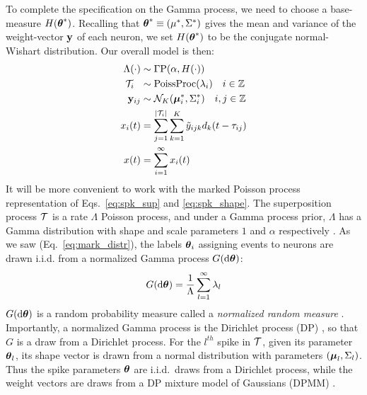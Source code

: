 To complete the specification on the Gamma process, we need to choose a base-measure $H(\boldsymbol{\theta}^*)$.
Recalling that $\boldsymbol{\theta}^* \equiv (\mu^*, \Sigma^*)$ gives the mean and variance of the weight-vector $\mathbf{y}$ of each neuron, we set $H(\boldsymbol{\theta}^*)$ 
to be the conjugate normal-Wishart distribution. Our overall model is then:
\begin{subequations}
\begin{align}
  \Lambda(\cdot) & \sim \Gamma \text{P}(\alpha, H(\cdot)) \\ %
  \mc{T}_i\ \  &\sim \text{PoissProc}(\lambda_i) \quad i \in \ZZ \\
  \by_{ij} & \sim \mc{N}_K(\mb{\mu}^*_i, \Sigma^*_i) \quad i,j \in \ZZ \\
  x_i(t) &= \sum_{j = 1}^{|\mc{T}_i|}  \sum_{k = 1}^{K} \tilde{y}_{ijk} d_k(t - \tau_{ij}) \\
  x(t)   &= \sum_{i=1}^{\infty} x_i(t)
\end{align}
\end{subequations}
% 
It will be more convenient to work with the marked Poisson process representation of Eqs.~\ref{eq:spk_sup} and \ref{eq:spk_shape}. 
The superposition process $\mathcal{T}$ is a rate $\Lambda$ Poisson process,
and under a Gamma process prior, $\Lambda$ has a Gamma distribution with shape and scale parameters $1$ and $\alpha$ respectively \citep{Ferguson73}.
As we saw (Eq.~\eqref{eq:mark_distr}), the labels $\boldsymbol{\theta}_i$ assigning events to neurons are drawn i.i.d. from a normalized Gamma 
process $G(\mathrm{d} \boldsymbol{\theta})$:
\begin{align}
 G(\mathrm{d} \boldsymbol{\theta}) = \frac{1}{\Lambda} \sum_{l=1}^{\infty} \lambda_l
\end{align}
$G(\mathrm{d} \boldsymbol{\theta})$ is a random probability measure called a \emph{normalized random measure} \citep{JamesLP09}. Importantly, a 
normalized Gamma process is the Dirichlet process (DP) \citep{Ferguson73}, so that $G$ is a draw from a Dirichlet process. For the $l^{th}$ spike in $\mathcal{T}$, given its 
parameter $\boldsymbol{\theta}_l$, its shape vector is drawn from a normal distribution
with parameters $(\boldsymbol{\mu}_{l}, \Sigma_{l})$. Thus the spike parameters $\boldsymbol{\theta}$ are i.i.d.\ draws from a Dirichlet process, while the weight vectors are
draws from a DP mixture model of Gaussians (DPMM) \citep{Lo1984}.

